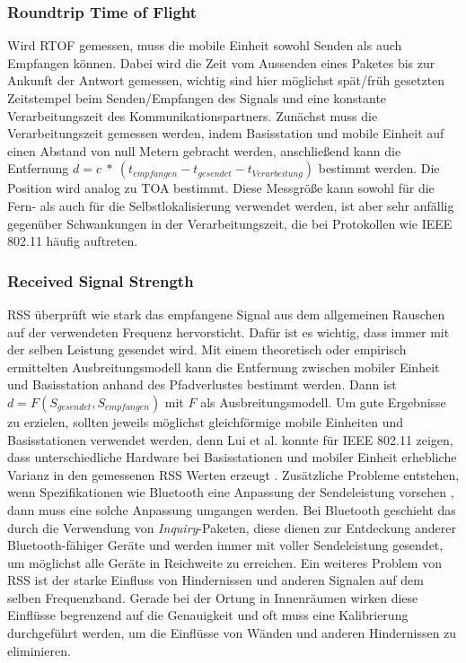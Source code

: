 \subsubsection{Roundtrip Time of Flight}
Wird RTOF gemessen, muss die mobile Einheit sowohl Senden als auch Empfangen können.
Dabei wird die Zeit vom Aussenden eines Paketes bis zur Ankunft der Antwort gemessen, wichtig sind hier möglichst spät/früh gesetzten Zeitstempel beim Senden/Empfangen des Signals und eine konstante Verarbeitungszeit des Kommunikationspartners.
Zunächst muss die Verarbeitungszeit gemessen werden, indem Basisstation und mobile Einheit auf einen Abstand von null Metern gebracht werden, anschließend kann die Entfernung $d = c\ *\ (t_{empfangen} - t_{gesendet} - t_{Verarbeitung})$ bestimmt werden.
Die Position wird analog zu TOA bestimmt. Diese Messgröße kann sowohl für die Fern- als auch für die Selbstlokalisierung verwendet werden, ist aber sehr anfällig gegenüber Schwankungen in der Verarbeitungszeit, die bei Protokollen wie IEEE 802.11 häufig auftreten.

\subsubsection{Received Signal Strength}
RSS überprüft wie stark das empfangene Signal aus dem allgemeinen Rauschen auf der verwendeten Frequenz hervorsticht.
Dafür ist es wichtig, dass immer mit der selben Leistung gesendet wird.
Mit einem theoretisch oder empirisch ermittelten Ausbreitungsmodell kann die Entfernung zwischen mobiler Einheit und Basisstation anhand des Pfadverlustes bestimmt werden.
Dann ist $d = F(S_{gesendet},S_{empfangen})$ mit $F$ als Ausbreitungsmodell.
Um gute Ergebnisse zu erzielen, sollten jeweils möglichst gleichförmige mobile Einheiten und Basisstationen verwendet werden, denn Lui et al. konnte für IEEE 802.11 zeigen, dass unterschiedliche Hardware bei Basisstationen und mobiler Einheit erhebliche Varianz in den gemessenen RSS Werten erzeugt \cite{lui2011differences}.
Zusätzliche Probleme entstehen, wenn Spezifikationen wie Bluetooth eine Anpassung der Sendeleistung vorsehen \cite{hossain2007comprehensive}, dann muss eine solche Anpassung umgangen werden.
Bei Bluetooth geschieht das durch die Verwendung von \emph{Inquiry}-Paketen, diese dienen zur Entdeckung anderer Bluetooth-fähiger Geräte und werden immer mit voller Sendeleistung gesendet, um möglichst alle Geräte in Reichweite zu erreichen.
Ein weiteres Problem von RSS ist der starke Einfluss von Hindernissen und anderen Signalen auf dem selben Frequenzband.
Gerade bei der Ortung in Innenräumen wirken diese Einflüsse begrenzend auf die Genauigkeit und oft muss eine Kalibrierung durchgeführt werden, um die Einflüsse von Wänden und anderen Hindernissen zu eliminieren.



